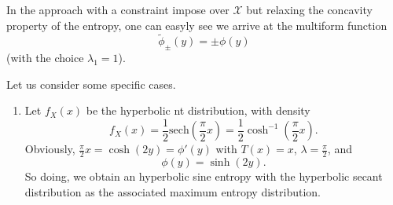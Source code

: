 \documentclass[english,onecolumn]{elsarticle}
\def\X{\mathcal{X}}
\begin{document}
In the  approach with a constraint  impose over $\X$ but  relaxing the concavity
property of the entropy, one can easyly see we arrive at the multiform function
%
\[
\widetilde{\phi}_\pm(y) = \pm \phi(y)
\]
%
(with the choice $\lambda_1 = 1$).




\vspace{1cm}

\centerline{\underline{\hspace{10cm}}}

\vspace{1cm}




Let us consider some specific cases. 
\begin{enumerate}
%
\item Let $f_{X}(x)$ be the hyperbolic nt distribution, with density
\[
f_{X}(x)=\frac12\text{sech}(\frac{\pi}{2}x)=\frac12\cosh^{-1}(\frac{\pi}{2}x).
\]
Obviously, $\frac{\pi}{2}x=\cosh(2y)=\phi'(y)$ with $T(x)=x$, $\lambda=\frac{\pi}{2}$,
and 
\[
\phi(y)=\sinh(2y).
\]
So doing, we obtain an hyperbolic sine entropy with the hyperbolic
secant distribution as the associated maximum entropy distribution.
\end{enumerate}
\end{document}
